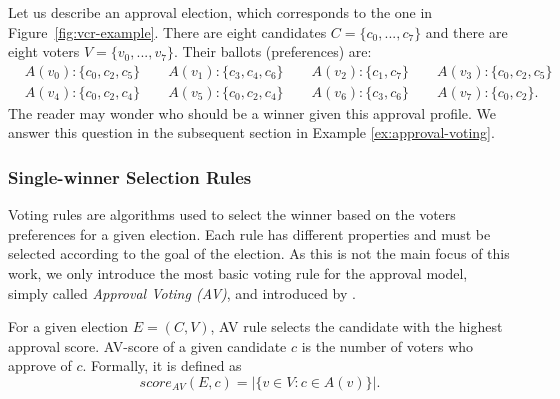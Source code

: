 \begin{example}\label{ex:approval-election}
    Let us describe an approval election, which corresponds to the one in Figure~\ref{fig:vcr-example}.
    There are eight candidates $C = \{c_0,...,c_7\}$ and there are eight voters $V = \{v_0,...,v_7\}$.
    Their ballots (preferences) are:
    \begin{align*}
        & A(v_0) : \{c_0, c_2, c_5\} \qquad A(v_1) : \{c_3, c_4, c_6\} \qquad A(v_2) : \{c_1, c_7\} \qquad A(v_3) : \{c_0, c_2, c_5\} \\
        & A(v_4) : \{c_0, c_2, c_4\} \qquad A(v_5) : \{c_0, c_2, c_4\} \qquad A(v_6) : \{c_3, c_6\} \qquad A(v_7) : \{c_0, c_2\}.
    \end{align*}
    The reader may wonder who should be a winner given this approval profile. 
    We answer this question in the subsequent section in Example \ref{ex:approval-voting}.   
\end{example}

\subsubsection{Single-winner Selection Rules}

Voting rules are algorithms used to select the winner based on the voters preferences for a given election.\footnotemark
Each rule has different properties and must be selected according to the goal of the election.
As this is not the main focus of this work, we only introduce the most basic voting rule for the approval model,
simply called \textit{Approval Voting (AV)}, and introduced by \cite{brams1983approval}.

\begin{definition}\label{ch2:def:av}
    For a given election $E = (C, V)$, AV rule selects the candidate with the highest approval score.
    AV-score of a given candidate $c$ is the number of voters who approve of $c$. 
    Formally, it is defined as \[score_{AV}(E,c) = |\{v \in V : c \in A(v)\}|.\]
\end{definition}

